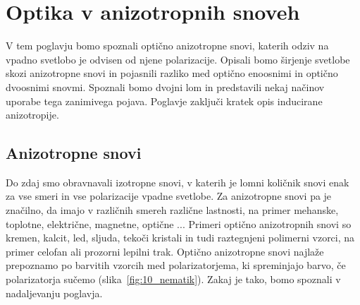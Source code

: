 
\chapter{Optika v anizotropnih snoveh}
\label{chap:AnizotropneSnovi}
V tem poglavju bomo spoznali optično anizotropne snovi, katerih odziv na 
vpadno svetlobo je odvisen od njene polarizacije. Opisali bomo 
širjenje svetlobe skozi anizotropne snovi in pojasnili razliko med optično 
enoosnimi in optično dvoosnimi snovmi. Spoznali bomo dvojni lom in 
predstavili nekaj načinov uporabe tega zanimivega pojava. Poglavje zaključi
kratek opis inducirane anizotropije.

\section{Anizotropne snovi}
\label{chap:AnizoLorentz}
Do zdaj smo obravnavali izotropne snovi, v katerih je lomni količnik 
snovi enak za vse smeri in vse polarizacije vpadne svetlobe. 
Za anizotropne snovi pa je značilno, da imajo 
v različnih smereh različne lastnosti, na primer mehanske, toplotne, 
električne, magnetne, optične ... Primeri optično 
anizotropnih snovi so kremen, kalcit, led, sljuda, tekoči kristali
in tudi raztegnjeni polimerni vzorci, na primer celofan ali prozorni lepilni trak. 
Optično anizotropne snovi najlaže prepoznamo po barvitih vzorcih med
polarizatorjema, ki spreminjajo barvo, če polarizatorja sučemo (slika~\ref{fig:10_nematik}). 
Zakaj je tako, bomo spoznali v nadaljevanju poglavja.
